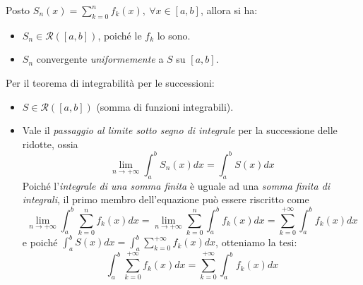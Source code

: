 \begin{demonstration}
	Posto $\displaystyle S_n\left(x\right)=\sum_{k=0}^{n}f_k\left(x\right),\ \forall x\in \left[a,b\right]$, allora si ha:
	\begin{itemize}
		\item $S_n\in\mathcal{R}\left(\left[a,b\right]\right)$, poiché le $f_k$ lo sono.
		\item $S_n$ convergente \textit{uniformemente} a $S$ su $\left[a,b\right]$.
	\end{itemize}
	Per il teorema di integrabilità per le successioni:
	\begin{itemize}
		\item $S\in\mathcal{R}\left(\left[a,b\right]\right)$ (somma di funzioni integrabili).
		\item Vale il \textit{passaggio al limite sotto segno di integrale} per la successione delle ridotte, ossia
		\begin{equation*}
			\lim_{n\to+\infty}\int_{a}^{b}S_n\left(x\right)dx=\int_{a}^{b}S\left(x\right)dx
		\end{equation*}
		Poiché l'\textit{integrale di una somma finita} è uguale ad una \textit{somma finita di integrali}, il primo membro dell'equazione può essere riscritto come
		\begin{equation*}
			\lim_{n\to+\infty}\int_{a}^{b}\sum_{k=0}^{n}f_k\left(x\right)dx=\lim_{n\to+\infty}\sum_{k=0}^{n}\int_{a}^{b}f_k\left(x\right)dx=\sum_{k=0}^{+\infty}\int_{a}^{b}f_k\left(x\right)dx
		\end{equation*}
		e poiché $\displaystyle \int_{a}^{b}S\left(x\right)dx=\int_{a}^{b}\sum_{k=0}^{+\infty}f_k\left(x\right)dx$, otteniamo la tesi:
		\begin{equation*}
			\int_{a}^{b}\sum_{k=0}^{+\infty}f_k\left(x\right)dx=\sum_{k=0}^{+\infty}\int_{a}^{b}f_k\left(x\right)dx
		\end{equation*}
	\end{itemize}
\end{demonstration}
